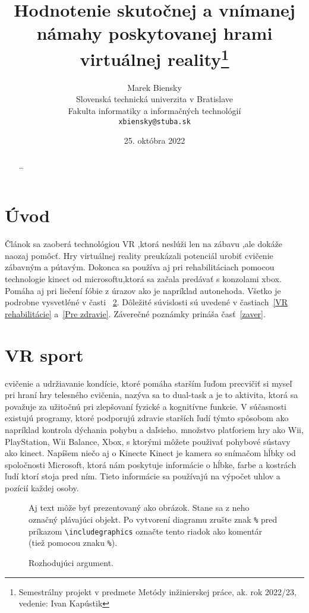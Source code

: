 \documentclass[10pt,twoside,slovak,a4paper]{article}
\title{Hodnotenie skutočnej a vnímanej námahy poskytovanej hrami virtuálnej reality\thanks{Semestrálny projekt v predmete Metódy inžinierskej práce, ak. rok 2022/23, vedenie: Ivan Kapústik}}
\author{Marek Biensky\\[2pt]
	{\small Slovenská technická univerzita v Bratislave}\\
	{\small Fakulta informatiky a informačných technológií}\\
	{\small \texttt{xbiensky@stuba.sk}}
	}
\date{\small 25. októbra 2022}
\begin{document}
\maketitle

\begin{abstract}
\ldots
\end{abstract}



\section{Úvod}
Článok sa zaoberá technológiou VR ,ktorá neslúži len na zábavu ,ale dokáže naozaj pomôcť.
Hry virtuálnej reality preukázali potenciál urobiť cvičenie zábavným a pútavým.
Dokonca sa používa aj pri rehabilitáciach pomocou technologie kinect od microsoftu,ktorá sa začala predávať s konzolami xbox.
Pomáha aj pri liečení fóbie z úrazov ako je napríklad autonehoda.
 Všetko je podrobne vysvetléné v časti ~\ref{VR sport}.
Dôležité súvislosti sú uvedené v častiach~\ref{VR rehabilitácie} a~\ref{Pre zdravie}.
Záverečné poznámky prináša časť~\ref{zaver}.


\section{VR sport} \label{VR sport}

cvičenie a udržiavanie kondície, ktoré pomáha starším ľuďom precvičiť si myseľ pri hraní hry
telesného cvičenia, nazýva sa to dual-task a je to aktivita, ktorá sa považuje za užitočnú pri zlepšovaní
fyzické a kognitívne funkcie.
V súčasnosti existujú programy, ktoré podporujú zdravie starších ľudí týmto spôsobom ako napríklad kontrola dýchania pohybu a daľsieho. množstvo platforiem
hry ako Wii, PlayStation, Wii Balance, Xbox, s ktorými môžete použivať pohybové sústavy ako kinect.
Napíšem niečo aj o Kinecte
Kinect je kamera so snímačom hĺbky od spoločnosti Microsoft, ktorá nám poskytuje informácie o hĺbke, farbe a kostrách ľudí
ktorí stoja pred ním. Tieto informácie sa používajú na výpočet uhlov a pozícií každej osoby.


\begin{figure*}[tbh]
\centering
Aj text môže byť prezentovaný ako obrázok. Stane sa z neho označný plávajúci objekt. Po vytvorení diagramu zrušte znak \texttt{\%} pred príkazom \verb|\includegraphics| označte tento riadok ako komentár (tiež pomocou znaku \texttt{\%}).
\caption{Rozhodujúci argument.}
\label{f:rozhod}
\end{figure*}
\end{document}
